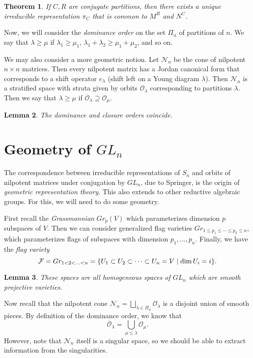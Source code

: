\documentclass[leqno, openany]{memoir}
\newtheorem{thm}{Theorem}[chapter]
\newtheorem{lem}[thm]{Lemma}
\theoremstyle{definition}
\theoremstyle{remark}
\theoremstyle{plain}
\theoremstyle{definition}
\theoremstyle{remark}
\newcommand{\mc}[1]{\mathcal{#1}}
\newcommand{\ol}[1]{\overline{#1}}
\begin{document}
\begin{thm} If $C, R$ are conjugate partitions, then there exists a unique
irreducible representation $\pi_C$ that is common to $M^R$ and $N^C$.
\end{thm}

Now, we will consider the \textit{dominance order} on the set $\Pi_n$ of
partitions of $n$. We say that $\lambda \geq \mu$ if $\lambda_1 \geq \mu_1$,
$\lambda_1 + \lambda_2 \geq \mu_1 + \mu_2$, and so on.

We may also consider a more geometric notion. Let $\mc{N}_n$ be the cone of
nilpotent $n \times n$ matrices. Then every nilpotent matrix has a Jordan
canonical form that corresponds to a shift operator $e_{\lambda}$ (shift left
on a Young diagram $\lambda$). Then $\mc{N}_n$ is a stratified space with
strata given by orbits $\mc{O}_{\lambda}$ corresponding to partitions
$\lambda$. Then we say that $\lambda \geq \mu$ if $\ol{\mc{O}}_{\lambda}
\supseteq \mc{O}_{\mu}$.

\begin{lem} The dominance and closure orders coincide.  \end{lem}

\section{Geometry of $GL_n$}%

The correspondence between irreducible representations of $S_n$ and orbits of
nilpotent matrices under conjugation by $GL_n$, due to Springer, is the origin
of \textit{geometric representation theory}. This also extends to other
reductive algebraic groups. For this, we will need to do some geometry.

First recall the \textit{Grassmannian} $Gr_p(V)$ which parameterizes dimension
$p$ subspaces of $V$. Then we can consider generalized flag varieties $Gr_{1
\leq p_1 \leq \cdots \leq p_k \leq n}$, which parameterizes flags of subspaces
with dimension $p_1, \ldots, p_n$. Finally, we have the \textit{flag variety}
\[ \mc{F} = Gr_{1<2<\ldots<n} = \qty{U_1 \subset U_2 \subset \cdots \subset U_n
= V \mid \dim U_i = i}. \]

\begin{lem} These spaces are all homogeneous spaces of $GL_n$ which are smooth
projective varieties.  \end{lem}

Now recall that the nilpotent cone $\mc{N}_n = \bigsqcup_{\lambda \in \Pi_n}
\mc{O}_{\lambda}$ is a disjoint union of smooth pieces. By definition of the
dominance order, we know that \[ \ol{\mc{O}}_{\lambda} = \bigcup_{\mu \leq
\lambda} \mc{O}_{\mu}. \] However, note that $\mc{N}_n$ itself is a singular
space, so we should be able to extract information from the singularities.
\end{document}
